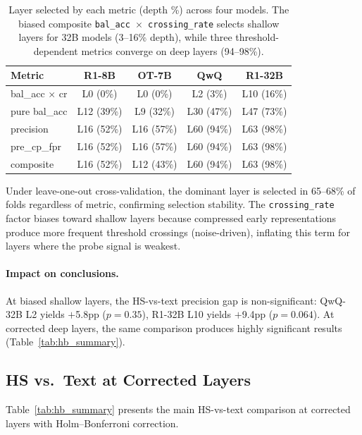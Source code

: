 \documentclass[11pt]{article}
\begin{document}
\begin{table}[t]
\centering
\small
\begin{tabular}{lcccc}
\toprule
\textbf{Metric} & \textbf{R1-8B} & \textbf{OT-7B} & \textbf{QwQ} & \textbf{R1-32B} \\
\midrule
bal\_acc $\times$ cr & L0 (0\%) & L0 (0\%) & L2 (3\%) & L10 (16\%) \\
pure bal\_acc & L12 (39\%) & L9 (32\%) & L30 (47\%) & L47 (73\%) \\
precision & L16 (52\%) & L16 (57\%) & L60 (94\%) & L63 (98\%) \\
pre\_cp\_fpr & L16 (52\%) & L16 (57\%) & L60 (94\%) & L63 (98\%) \\
composite & L16 (52\%) & L12 (43\%) & L60 (94\%) & L63 (98\%) \\
\bottomrule
\end{tabular}
\caption{Layer selected by each metric (depth \%) across four models. The biased composite \texttt{bal\_acc $\times$ crossing\_rate} selects shallow layers for 32B models (3--16\% depth), while three threshold-dependent metrics converge on deep layers (94--98\%).}
\label{tab:layer_selection}
\end{table}

Under leave-one-out cross-validation, the dominant layer is selected in 65--68\% of folds regardless of metric, confirming selection stability. The \texttt{crossing\_rate} factor biases toward shallow layers because compressed early representations produce more frequent threshold crossings (noise-driven), inflating this term for layers where the probe signal is weakest.

\paragraph{Impact on conclusions.}
At biased shallow layers, the HS-vs-text precision gap is non-significant: QwQ-32B L2 yields $+$5.8pp ($p=0.35$), R1-32B L10 yields $+$9.4pp ($p=0.064$). At corrected deep layers, the same comparison produces highly significant results (Table~\ref{tab:hb_summary}).

\subsection{HS vs.\ Text at Corrected Layers}
\label{sec:hs_vs_text}

Table~\ref{tab:hb_summary} presents the main HS-vs-text comparison at corrected layers with Holm--Bonferroni correction.
\end{document}
